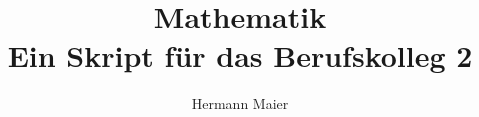 \documentclass[a4paper,12pt, headsepline, ngerman]{scrartcl}
\theoremstyle{definition}
\newcommand{\fakesection}[1]{%
	\par\refstepcounter{section}%
	\sectionmark{#1}%
	\addcontentsline{toc}{section}{\protect\numberline{\thesection}#1}%
}
\newcommand{\fakesubsection}[1]{%
	\par\refstepcounter{subsection}%
	\subsectionmark{#1}%
	\addcontentsline{toc}{subsection}{\protect\numberline{\thesubsection}#1}%
}
\begin{document}
	\setlength\parindent{0pt} %

	\cofoot[\pagemark]{\pagemark}
	\title{Mathematik\\
		Ein Skript für das Berufskolleg 2}
	\author{Hermann Maier}

	\def\grundlagen{./Arbeitsblaetter/Grundlagen}
	\def\linFkt{./Arbeitsblaetter/LineareFunktionen}
	\def\quadFkt{./Arbeitsblaetter/QuadratischeFunktionen}
	\def\ganzFkt{./Arbeitsblaetter/GanzrationaleFunktionen}
	\def\eFkt{./Arbeitsblaetter/EFunktionen}
	\def\ableitung{./Arbeitsblaetter/Ableitung}
%	
%	
%	
%	
%	
%	
%	
%	
%	
%	
%	
%	
%	
%	
%	
%	
%	
%	
%	
%	
% 	
% 	
% 	
% 	
% 	
% 	
\end{document}
